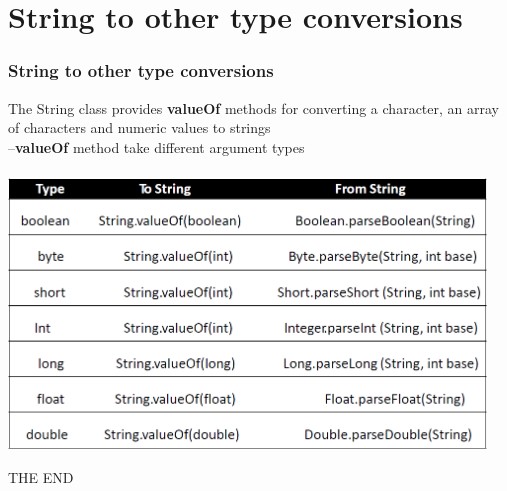 \documentclass{beamer}
\begin{document}


\section{String to other type conversions}

\begin{frame}
\frametitle{String to other type conversions}
The String class provides \textbf{valueOf} methods for
converting a character, an array of characters and
numeric values to strings\\
–\textbf{valueOf} method take different argument types\\~\\
\includegraphics[width=0.95\textwidth]{valueOf.png}
\end{frame}




\begin{frame}
\Huge{\centerline{THE END }}
\end{frame}

\end{document}
